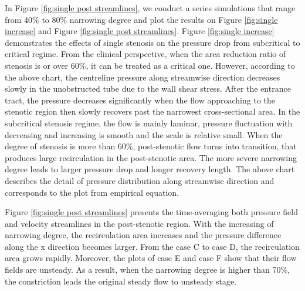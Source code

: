 In Figure \ref{fig:single post streamlines},  we conduct a series simulations that range from 40\% to 80\% narrowing degree and plot the results on Figure \ref{fig:single increase} and Figure \ref{fig:single post streamlines}.
Figure \ref{fig:single increase} demonstrates the effects of single stenosis on the pressure drop from subcritical to critical regime. From the clinical perspective, when the area reduction ratio of stenosis is or over 60\%, it can be treated as a critical one. However, according to the above chart, the centreline pressure along streamwise direction decreases slowly in the unobstructed tube due to the wall shear stress. 
After the entrance tract, the pressure decreases significantly when the flow approaching to the stenotic region then slowly recovers past the narrowest cross-sectional area.
In the subcritical stenosis regime, the flow is mainly laminar, pressure fluctuation with decreasing and increasing is smooth and the scale is relative small.
When the degree of stenosis is more than 60\%, post-stenotic flow turns into transition, that produces large recirculation in the post-stenotic area.
The more severe narrowing degree leads to larger pressure drop and longer recovery length.
The above chart describes the detail of pressure distribution along streamwise direction and corresponds to the plot from empirical equation.

Figure \ref{fig:single post streamlines} presents the time-averaging both pressure field and velocity streamlines in the post-stenotic region. 
With the increasing of narrowing degree, the recirculation area increases and the pressure difference along the x direction becomes larger. 
From the case C to case D, the recirculation area grows rapidly.
Moreover, the plots of case E and case F show that their flow fields are unsteady.
As a result, when the narrowing degree is higher than 70\%, the constriction leads the original steady flow to unsteady stage.

